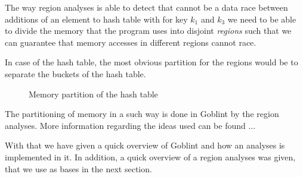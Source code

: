 \documentclass[..thesis.tex]{subfiles}
\begin{document}
The way region analyses is able to detect that cannot be a data race between additions of an element to hash table with for key $k_1$ and $k_3$ we need to be able to divide the memory that the program uses into disjoint \textit{regions} such that we can guarantee that memory accesses in different regions cannot race.

In case of the hash table, the most obvious partition for the regions would be to separate the buckets of the hash table.


\begin{figure}[H]
  \centering
    \caption{Memory partition of the hash table}
\end{figure}

The partitioning of memory in a such way is done in Goblint by the region analyses. More information regarding the ideas used can be found ... 

With that we have given a quick overview of Goblint and how an analyses is implemented in it. In addition, a quick overview of a region analyses was given, that we use as bases in the next section.
\end{document}
